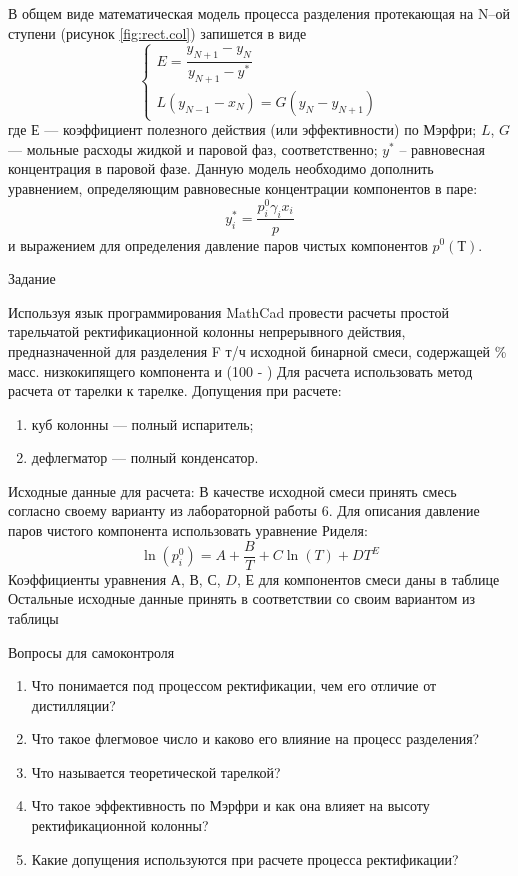 В общем виде математическая модель процесса разделения протекающая на N--ой ступени (рисунок \ref{fig:rect.col}) запишется в виде
\begin{equation}
\left\lbrace 
\begin{gathered} 
E=\dfrac{y_{N+1}-y_{N}}{y_{N+1}-y^*}\\
L(y_{N-1}-x_N)=G(y_N-y_{N+1})
\end{gathered} 
\right.
\end{equation}
где $Е$ --- коэффициент полезного действия (или эффективности) по Мэрфри; $L$, $G$ --- мольные расходы жидкой и паровой фаз, соответственно; $y^*$ – равновесная концентрация в паровой фазе. Данную модель необходимо дополнить уравнением, определяющим равновесные концентрации компонентов в паре:
\begin{equation}
	y_i^*=\dfrac{p_i^0 \gamma_i x_i}{p}
\end{equation}
и выражением для определения давление паров чистых компонентов $p^0(Т)$.

Задание

Используя язык программирования MathCad провести расчеты простой тарельчатой ректификационной колонны непрерывного действия, предназначенной для разделения F т/ч исходной бинарной смеси, содержащей  \% масс. низкокипящего компонента и (100 - ) %
Для расчета использовать метод расчета от тарелки к тарелке. Допущения при расчете:
\begin{enumerate}
\item куб колонны --- полный испаритель;
\item дефлегматор --- полный конденсатор.
\end{enumerate}

Исходные данные для расчета:
В качестве исходной смеси принять смесь согласно своему варианту из лабораторной работы 6. Для описания давление паров чистого компонента использовать уравнение Риделя:
\begin{equation}
	\ln (p_i^0)= A + \dfrac{B}{T}  + C \ln(T) + D T^E
\end{equation}
Коэффициенты уравнения $А$, $В$, $С$, $D$, $Е$ для компонентов смеси даны в таблице \ %
Остальные исходные данные принять в соответствии со своим вариантом из таблицы %

Вопросы для самоконтроля
\begin{enumerate}
\item Что понимается под процессом ректификации, чем его отличие от дистилляции? 
\item Что такое флегмовое число и каково его влияние на процесс разделения?
\item Что называется теоретической тарелкой?
\item Что такое эффективность по Мэрфри и как она влияет на высоту ректификационной колонны?
\item Какие допущения используются при расчете процесса ректификации?
\end{enumerate}

